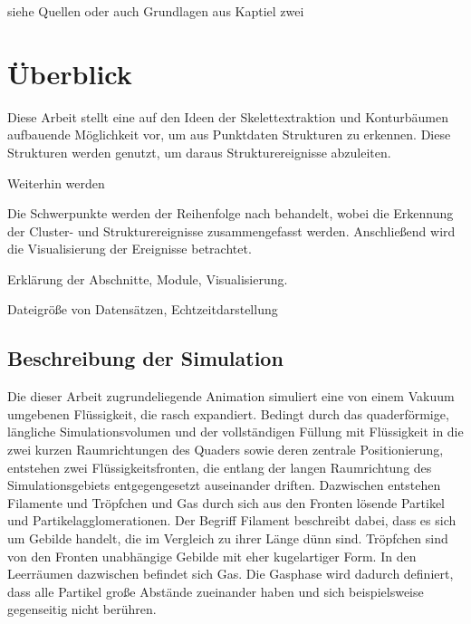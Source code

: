 siehe Quellen oder auch Grundlagen aus Kaptiel zwei



\chapter{Überblick}

Diese Arbeit stellt eine auf den Ideen der Skelettextraktion und Konturbäumen aufbauende Möglichkeit vor, um aus Punktdaten Strukturen zu erkennen. Diese Strukturen werden genutzt, um daraus Strukturereignisse abzuleiten.

Weiterhin werden %


Die Schwerpunkte werden der Reihenfolge nach behandelt, wobei die Erkennung der Cluster- und Strukturereignisse zusammengefasst werden. Anschließend wird die Visualisierung der Ereignisse betrachtet.

Erklärung der Abschnitte, Module, Visualisierung.

Dateigröße von Datensätzen, Echtzeitdarstellung

\section{Beschreibung der Simulation}

Die dieser Arbeit zugrundeliegende Animation simuliert eine von einem Vakuum umgebenen Flüssigkeit, die rasch expandiert. Bedingt durch das quaderförmige, längliche Simulationsvolumen und der vollständigen Füllung mit Flüssigkeit in die zwei kurzen Raumrichtungen des Quaders sowie deren zentrale Positionierung, entstehen zwei Flüssigkeitsfronten, die entlang der langen Raumrichtung des Simulationsgebiets entgegengesetzt auseinander driften. Dazwischen entstehen Filamente und Tröpfchen und Gas durch sich aus den Fronten lösende Partikel und Partikelagglomerationen. Der Begriff Filament beschreibt dabei, dass es sich um Gebilde handelt, die im Vergleich zu ihrer Länge dünn sind. Tröpfchen sind von den Fronten unabhängige Gebilde mit eher kugelartiger Form. In den Leerräumen dazwischen befindet sich Gas. Die Gasphase wird dadurch definiert, dass alle Partikel große Abstände zueinander haben und sich beispielsweise gegenseitig nicht berühren.

